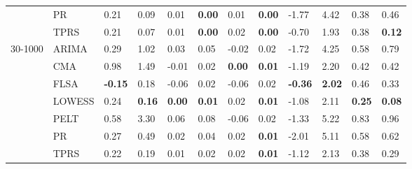 \begin{table}[ht]
\begin{tabular}{llllllllllll}
   & PR & 0.21 & 0.09 & 0.01 & \textbf{0.00} & 0.01 & \textbf{0.00} & -1.77 & 4.42 & 0.38 & 0.46 \\ 
   & TPRS & 0.21 & 0.07 & 0.01 & \textbf{0.00} & 0.02 & \textbf{0.00} & -0.70 & 1.93 & 0.38 & \textbf{0.12} \\ 
  30-1000 & ARIMA & 0.29 & 1.02 & 0.03 & 0.05 & -0.02 & 0.02 & -1.72 & 4.25 & 0.58 & 0.79 \\ 
   & CMA & 0.98 & 1.49 & -0.01 & 0.02 & \textbf{0.00} & \textbf{0.01} & -1.19 & 2.20 & 0.42 & 0.42 \\ 
   & FLSA & \textbf{-0.15} & 0.18 & -0.06 & 0.02 & -0.06 & 0.02 & \textbf{-0.36} & \textbf{2.02} & 0.46 & 0.33 \\ 
   & LOWESS & 0.24 & \textbf{0.16} & \textbf{0.00} & \textbf{0.01} & 0.02 & \textbf{0.01} & -1.08 & 2.11 & \textbf{0.25} & \textbf{0.08} \\ 
   & PELT & 0.58 & 3.30 & 0.06 & 0.08 & -0.06 & 0.02 & -1.33 & 5.22 & 0.83 & 0.96 \\ 
   & PR & 0.27 & 0.49 & 0.02 & 0.04 & 0.02 & \textbf{0.01} & -2.01 & 5.11 & 0.58 & 0.62 \\ 
   & TPRS & 0.22 & 0.19 & 0.01 & 0.02 & 0.02 & \textbf{0.01} & -1.12 & 2.13 & 0.38 & 0.29 \\ 
   \bottomrule
\end{tabular}
\end{table}
